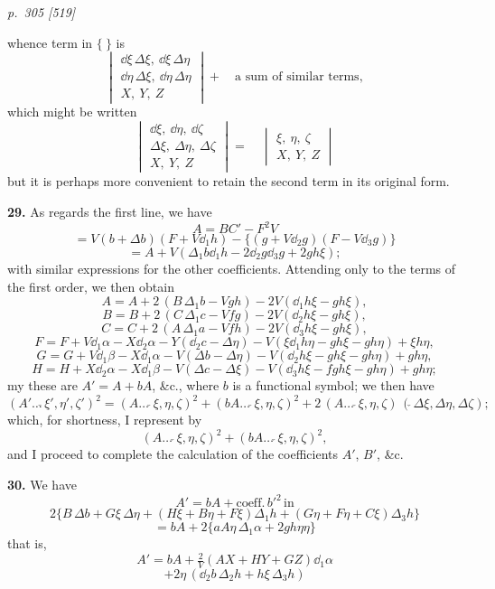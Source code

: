 \documentclass[11pt,a4paper]{book}
\begin{document}
\clearpage

\bigskip
\textit{p.~305 [519]}
\smallskip

\noindent
whence term in $\{\ \}$ is
\[
\begin{vmatrix}
\dd\xi\,\Delta\xi,\ \dd\xi\,\Delta\eta \\
\dd\eta\,\Delta\xi,\ \dd\eta\,\Delta\eta \\
X,\ Y,\ Z
\end{vmatrix}
+\quad \text{a sum of similar terms},
\]
which might be written
\[
\begin{vmatrix}
\dd\xi,\ \dd\eta,\ \dd\zeta \\
\Delta\xi,\ \Delta\eta,\ \Delta\zeta \\
X,\ Y,\ Z
\end{vmatrix} = \quad
\begin{vmatrix}
\xi,\ \eta,\ \zeta \\
X,\ Y,\ Z
\end{vmatrix}
\]
but it is perhaps more convenient to retain the second term in its original form.

\textbf{29.} As regards the first line, we have
\[
A = BC' - F^2 V
\]
\[
= V(b + \Delta b)(F + V\dd_{1} h) - \{(g + V\dd_{2} g)(F - V\dd_{3} g)\}
\]
\[
= A + V(\Delta_{1} b\dd_{1} h - 2\dd_{2} g\dd_{3} g + 2 g h\xi);
\]
with similar expressions for the other coefficients. Attending only to the terms of the first order, we then obtain
\[
A = A + 2\,(B\,\Delta_{1} b - Vg h) - 2V(\dd_{1} h\xi - g h\xi),
\]
\[
B = B + 2\,(C\,\Delta_{1} c - Vf g) - 2V(\dd_{2} h\xi - g h\xi),
\]
\[
C = C + 2\,(A\,\Delta_{1} a - Vf h) - 2V(\dd_{3} h\xi - g h\xi),
\]
\[
F = F + V\dd_{1} \alpha - X\dd_{2} \alpha - Y(\dd_{2} c - \Delta\eta) - V(\xi\dd_{1} h\eta - g h\xi - g h\eta) + \xi h\eta,
\]
\[
G = G + V\dd_{1} \beta - X\dd_{1} \alpha - V(\Delta b - \Delta\eta) - V(\dd_{2} h\xi - g h\xi - g h\eta) + g h\eta,
\]
\[
H = H + X\dd_{2} \alpha - X\dd_{1} \beta - V(\Delta c - \Delta\xi) - V(\dd_{3} h\xi - f g h\xi - g h\eta) + g h\eta;
\]
my these are $A' = A + b A$, \&c., where $b$ is a functional symbol; we then have
\[
(A'\ldots\check{}\,\xi',\eta',\zeta')^2 = (A\ldots\,\check{}\,\xi,\eta,\zeta)^2 + (b A\ldots\,\check{}\,\xi,\eta,\zeta)^2 + 2\,(A\ldots\,\check{}\,\xi,\eta,\zeta)\,(\check{}\,\Delta\xi,\Delta\eta,\Delta\zeta);
\]
which, for shortness, I represent by
\[
(A\ldots\,\check{}\,\xi,\eta,\zeta)^2 + (b A\ldots\,\check{}\,\xi,\eta,\zeta)^2,
\]
and I proceed to complete the calculation of the coefficients $A'$, $B'$, \&c.

\textbf{30.} We have
\[
A' = b A + \text{coeff.}\, b'^2\, \text{in}
\]
\[
2\{B\,\Delta b + G\xi\,\Delta\eta + (H\xi + B\eta + F\xi)\Delta_{1} h + (G\eta + F\eta + C\xi)\Delta_{3} h\}
\]
\[
= b A + 2\{a A\eta\,\Delta_{1} \alpha + 2 g h\eta\eta\}
\]
that is,
\[
A' = b A + \tfrac{2}{V}(A X + H Y + G Z)\dd_{1} \alpha
\]
\[
+ 2\eta\,(\dd_{2} b\,\Delta_{2} h + h\xi\,\Delta_{3} h)
\]
\end{document}

